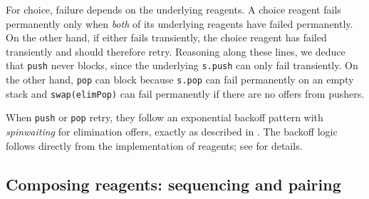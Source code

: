 \documentclass[preprint,nocopyrightspace]{sigplanconf}
\begin{document}
For choice, failure depends on the underlying reagents.  A choice
reagent fails permanently only when \emph{both} of its underlying
reagents have failed permanently.  On the other hand, if either fails
transiently, the choice reagent has failed transiently and should
therefore retry.  Reasoning along these lines, we deduce that
\lstinline{push} never blocks, since the underlying \lstinline{s.push}
can only fail transiently.  On the other hand, \lstinline{pop} can
block because \lstinline{s.pop} can fail permanently on an empty stack
and \lstinline{swap(elimPop)} can fail permanently if there are no
offers from pushers.

When \lstinline{push} or \lstinline{pop} retry, they follow an
exponential backoff pattern with \emph{spinwaiting} for elimination
offers, exactly as described in .  The backoff
logic follows directly from the implementation of reagents; see
 for details.



\subsection{Composing reagents: sequencing and pairing}
\label{sec:conjunction}
\end{document}
